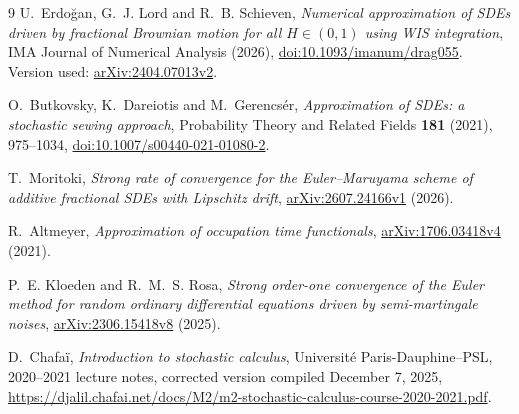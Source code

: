 \documentclass[11pt]{article}
\theoremstyle{remark}
\begin{document}
\begin{thebibliography}{9}
U.~Erdo\u{g}an, G.~J. Lord and R.~B. Schieven,
\emph{Numerical approximation of SDEs driven by fractional Brownian motion
for all \(H\in(0,1)\) using WIS integration},
IMA Journal of Numerical Analysis (2026),
\href{https://doi.org/10.1093/imanum/drag055}{doi:10.1093/imanum/drag055}.
Version used: \href{https://arxiv.org/abs/2404.07013v2}{arXiv:2404.07013v2}.

O.~Butkovsky, K.~Dareiotis and M.~Gerencs\'er,
\emph{Approximation of SDEs: a stochastic sewing approach},
Probability Theory and Related Fields \textbf{181} (2021), 975--1034,
\href{https://doi.org/10.1007/s00440-021-01080-2}{doi:10.1007/s00440-021-01080-2}.

T.~Moritoki,
\emph{Strong rate of convergence for the Euler--Maruyama scheme of additive
fractional SDEs with Lipschitz drift},
\href{https://arxiv.org/abs/2607.24166v1}{arXiv:2607.24166v1} (2026).

R.~Altmeyer,
\emph{Approximation of occupation time functionals},
\href{https://arxiv.org/abs/1706.03418v4}{arXiv:1706.03418v4} (2021).

P.~E. Kloeden and R.~M.~S. Rosa,
\emph{Strong order-one convergence of the Euler method for random ordinary
differential equations driven by semi-martingale noises},
\href{https://arxiv.org/abs/2306.15418v8}{arXiv:2306.15418v8} (2025).

D.~Chafa\"i,
\emph{Introduction to stochastic calculus},
Universit\'e Paris-Dauphine--PSL, 2020--2021 lecture notes,
corrected version compiled December 7, 2025,
\url{https://djalil.chafai.net/docs/M2/m2-stochastic-calculus-course-2020-2021.pdf}.
\end{thebibliography}
\end{document}
